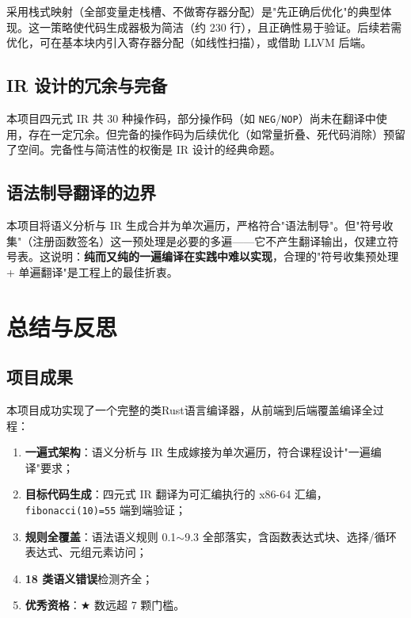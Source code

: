 \documentclass[12pt,a4paper]{ctexart}
\begin{document}
采用栈式映射（全部变量走栈槽、不做寄存器分配）是"先正确后优化"的典型体现。这一策略使代码生成器极为简洁（约 230 行），且正确性易于验证。后续若需优化，可在基本块内引入寄存器分配（如线性扫描），或借助 LLVM 后端。

\subsection{IR 设计的冗余与完备}

本项目四元式 IR 共 30 种操作码，部分操作码（如 \texttt{NEG}/\texttt{NOP}）尚未在翻译中使用，存在一定冗余。但完备的操作码为后续优化（如常量折叠、死代码消除）预留了空间。完备性与简洁性的权衡是 IR 设计的经典命题。

\subsection{语法制导翻译的边界}

本项目将语义分析与 IR 生成合并为单次遍历，严格符合"语法制导"。但"符号收集"（注册函数签名）这一预处理是必要的多遍——它不产生翻译输出，仅建立符号表。这说明：\textbf{纯而又纯的一遍编译在实践中难以实现}，合理的"符号收集预处理 + 单遍翻译"是工程上的最佳折衷。

\newpage

\section{总结与反思}

\subsection{项目成果}

本项目成功实现了一个完整的类Rust语言编译器，从前端到后端覆盖编译全过程：
\begin{enumerate}
    \item \textbf{一遍式架构}：语义分析与 IR 生成嫁接为单次遍历，符合课程设计"一遍编译"要求；
    \item \textbf{目标代码生成}：四元式 IR 翻译为可汇编执行的 x86-64 汇编，\texttt{fibonacci(10)=55} 端到端验证；
    \item \textbf{规则全覆盖}：语法语义规则 0.1\(\sim\)9.3 全部落实，含函数表达式块、选择/循环表达式、元组元素访问；
    \item \textbf{18 类语义错误}检测齐全；
    \item \textbf{优秀资格}：$\bigstar$ 数远超 7 颗门槛。
\end{enumerate}
\end{document}
